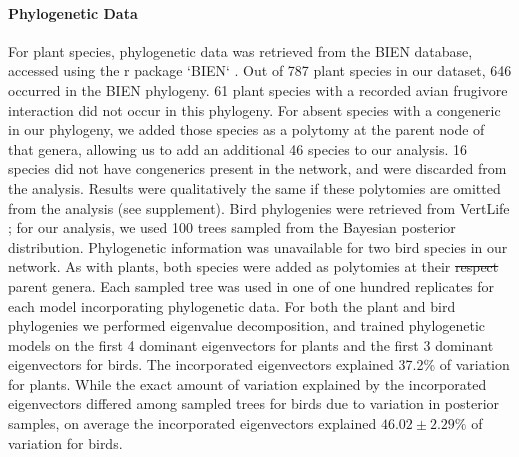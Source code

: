 \documentclass[num-refs]{article}%
\providecommand{\DIFadd}[1]{{\protect\color{blue}\uwave{#1}}} %
\providecommand{\DIFdel}[1]{{\protect\color{red}\sout{#1}}}                      %
\providecommand{\DIFaddbegin}{} %
\providecommand{\DIFaddend}{} %
\providecommand{\DIFdelbegin}{} %
\providecommand{\DIFdelend}{} %
\newcommand{\DIFscaledelfig}{0.5}
\newlength{\DIFdelgraphicswidth} %
\newlength{\DIFdelgraphicsheight} %
\newcommand{\DIFaddincludegraphics}[2][]{{\color{blue}\fbox{\DIFOincludegraphics[#1]{#2}}}} %
\newcommand{\DIFdelincludegraphics}[2][]{%
\sbox{\DIFdelgraphicsbox}{\DIFOincludegraphics[#1]{#2}}%
\settoboxwidth{\DIFdelgraphicswidth}{\DIFdelgraphicsbox} %
\settoboxtotalheight{\DIFdelgraphicsheight}{\DIFdelgraphicsbox} %
\scalebox{\DIFscaledelfig}{%
\parbox[b]{\DIFdelgraphicswidth}{\usebox{\DIFdelgraphicsbox}\\[-\baselineskip] \rule{\DIFdelgraphicswidth}{0em}}\llap{\resizebox{\DIFdelgraphicswidth}{\DIFdelgraphicsheight}{%
\setlength{\unitlength}{\DIFdelgraphicswidth}%
\begin{picture}(1,1)%
\thicklines\linethickness{2pt} %
{\color[rgb]{1,0,0}\put(0,0){\framebox(1,1){}}}%
{\color[rgb]{1,0,0}\put(0,0){\line( 1,1){1}}}%
{\color[rgb]{1,0,0}\put(0,1){\line(1,-1){1}}}%
\end{picture}%
}\hspace*{3pt}}} %
} %
\DeclareRobustCommand{\DIFaddbegin}{\DIFOaddbegin \let\includegraphics\DIFaddincludegraphics} %
\DeclareRobustCommand{\DIFaddend}{\DIFOaddend \let\includegraphics\DIFOincludegraphics} %
\DeclareRobustCommand{\DIFdelbegin}{\DIFOdelbegin \let\includegraphics\DIFdelincludegraphics} %
\DeclareRobustCommand{\DIFdelend}{\DIFOaddend \let\includegraphics\DIFOincludegraphics} %
\begin{document}
\paragraph{Phylogenetic Data}
For plant species, phylogenetic data was retrieved from the BIEN database, accessed using the r package `BIEN` \citep{maitner2018bien}. Out of 787 plant species in our dataset, 646 occurred in the BIEN phylogeny. 61 plant species with a recorded avian frugivore interaction did not occur in this phylogeny. For absent species with a congeneric in our phylogeny, we added those species as a polytomy at the parent node of that genera, allowing us to add an additional 46 species to our analysis. 16 species did not have congenerics present in the network, and were discarded from the analysis. Results were qualitatively the same if these polytomies are omitted from the analysis (see supplement). Bird phylogenies were retrieved from VertLife \citep{jetz2012}; for our analysis, we used 100 trees sampled from the Bayesian posterior distribution. Phylogenetic information was unavailable for two bird species in our network. As with plants, both species were added as polytomies at their \DIFdelbegin \DIFdel{respect }\DIFdelend \DIFaddbegin \DIFadd{respective }\DIFaddend parent genera. Each sampled tree was used in one of one hundred replicates for each model incorporating phylogenetic data. For both the plant and bird phylogenies we performed eigenvalue decomposition, and trained phylogenetic models on the first 4 dominant eigenvectors for plants and the first 3 dominant eigenvectors for birds. The incorporated eigenvectors explained 37.2\% of variation for plants. While the exact amount of variation explained by the incorporated eigenvectors differed among sampled trees for birds due to variation in posterior samples, on average the incorporated eigenvectors explained $46.02\pm 2.29\%$ of variation for birds. 
\end{document}
